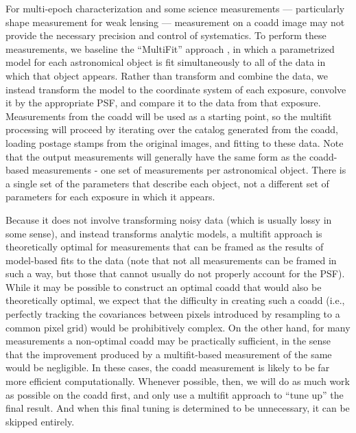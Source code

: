 \documentclass[12pt]{article}
\begin{document}
For multi-epoch characterization and some science measurements --- particularly shape measurement for weak
lensing --- measurement on a coadd image may not provide the necessary
precision and control of systematics.  To perform these measurements,
we baseline the ``MultiFit'' approach \cite{Bosch10, Bosch13}, in which a
parametrized model for each astronomical object is fit simultaneously
to all of the data in which that object appears.  Rather than
transform and combine the data, we instead transform the model to the
coordinate system of each exposure, convolve it by the appropriate
PSF, and compare it to the data from that exposure.  Measurements from
the coadd will be used as a starting point, so the multifit processing
will proceed by iterating over the catalog generated from the coadd,
loading postage stamps from the original images, and fitting to these
data.  Note that the output measurements will generally have the same
form as the coadd-based measurements - one set of measurements per
astronomical object. There is a single set of the
parameters that describe each object, not a different set of parameters
for each exposure in which it appears.

Because it does not involve transforming noisy data (which is usually
lossy in some sense), and instead transforms analytic models, a
multifit approach is theoretically optimal for measurements that can
be framed as the results of model-based fits to the data (note that
not all measurements can be framed in such a way, but those that
cannot usually do not properly account for the PSF). %
While it may be
possible to construct an optimal coadd that would also be
theoretically optimal, we expect that the difficulty in creating such
a coadd (i.e., perfectly tracking the covariances between pixels
introduced by resampling to a common pixel grid) would be prohibitively
complex.  On the other hand, for many measurements a non-optimal coadd
may be practically
sufficient, in the sense that the improvement produced by a
multifit-based measurement of the same would be negligible.  In these
cases, the coadd measurement is likely to be far more efficient
computationally.  Whenever possible, then, we will do as much work as
possible on the coadd first, and only use a multifit approach to ``tune up''
the final result.  And when this final tuning is determined to be
unnecessary, it can be skipped entirely.
\end{document}
